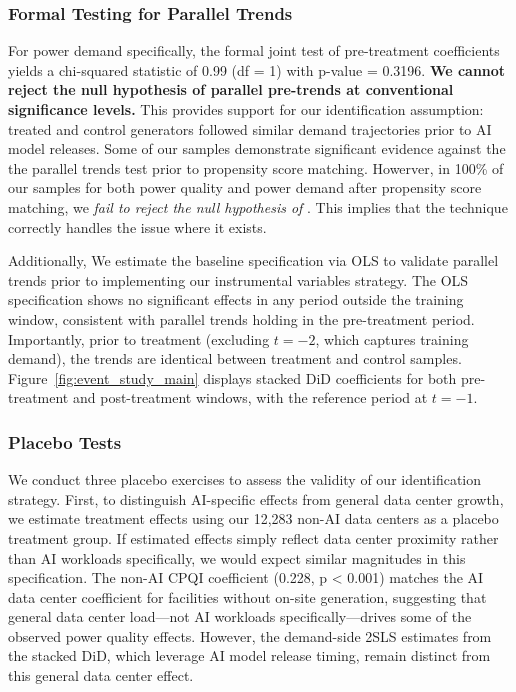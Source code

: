 \documentclass[sigconf]{acmart}
\begin{document}
\subsubsection{Formal Testing for Parallel Trends}

 For power demand specifically, the formal joint test of pre-treatment coefficients yields a chi-squared statistic of 0.99 (df = 1) with p-value = 0.3196. \textbf{We cannot reject the null hypothesis of parallel pre-trends at conventional significance levels.} This provides support for our identification assumption: treated and control generators followed similar demand trajectories prior to AI model releases. Some of our samples demonstrate significant evidence against the the parallel trends test prior to propensity score matching. Howerver, in 100\% of our samples for both power quality and power demand after propensity score matching, we \textit{fail to reject the null hypothesis of }. This implies that the technique correctly handles the issue where it exists. 
 
 Additionally, We estimate the baseline specification via OLS to validate parallel trends prior to implementing our instrumental variables strategy. The OLS specification shows no significant effects in any period outside the training window, consistent with parallel trends holding in the pre-treatment period. Importantly, prior to treatment (excluding $t=-2$, which captures training demand), the trends are identical between treatment and control samples. Figure~\ref{fig:event_study_main} displays stacked DiD coefficients for both pre-treatment and post-treatment windows, with the reference period at $t=-1$.

 \subsubsection{Placebo Tests}
We conduct three placebo exercises to assess the validity of our identification strategy. First, to distinguish AI-specific effects from general data center growth, we estimate treatment effects using our 12,283 non-AI data centers as a placebo treatment group. If estimated effects simply reflect data center proximity rather than AI workloads specifically, we would expect similar magnitudes in this specification. The non-AI CPQI coefficient (0.228, p < 0.001) matches the AI data center coefficient for facilities without on-site generation, suggesting that general data center load---not AI workloads specifically---drives some of the observed power quality effects. However, the demand-side 2SLS estimates from the stacked DiD, which leverage AI model release timing, remain distinct from this general data center effect.
\end{document}
